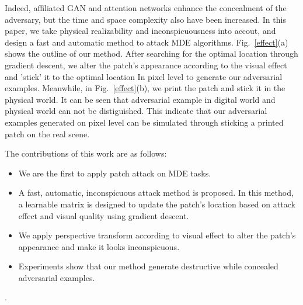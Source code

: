 \documentclass[10pt,twocolumn,letterpaper]{article}
\begin{document}


Indeed, affiliated GAN and attention networks enhance 
the concealment of the adversary, 
but the time and space complexity also have been increased.
In this paper, we take physical realizability and 
inconspicuousness into accout, and design a fast and automatic
method to attack MDE algorithms.
Fig.~\ref{effect}(a) shows the outline of our method.
After searching for the optimal location through gradient 
descent, we alter the patch's appearance according to the 
visual effect and 'stick' it to the optimal location In
pixel level to generate our adversarial examples.
Meanwhile, in Fig.~\ref{effect}(b), we print the patch
and stick it in the physical world.
It can be seen that adversarial example in digital world 
and physical world can not be distiguished.
This indicate that our adversarial examples generated
on pixel level can be simulated through sticking a printed patch 
on the real scene.

The contributions of this work are as follows:
\begin{itemize}
	\item We are the first to apply patch attack on MDE
	tasks.
	\item  A fast, automatic, inconspicuous attack 
	method is proposed. In this method, a learnable 
	matrix is designed to update the patch's location
	based on attack effect and visual quality using gradient 
	descent. 
	\item We apply perspective transform according to visual 
	effect to alter the patch's appearance and make 
	it looks inconspicuous. 
	\item Experiments show that our method generate destructive 
	while concealed adversarial examples.
\end{itemize}.
\end{document}
